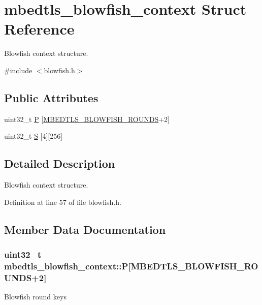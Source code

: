 \hypertarget{structmbedtls__blowfish__context}{\section{mbedtls\-\_\-blowfish\-\_\-context Struct Reference}
\label{structmbedtls__blowfish__context}
}


Blowfish context structure.  




{\ttfamily \#include $<$blowfish.\-h$>$}

\subsection*{Public Attributes}
\begin{DoxyCompactItemize}
\item 
uint32\-\_\-t \hyperlink{structmbedtls__blowfish__context_a6797f919a5b195cef17647d3d63ec13f}{P} \mbox{[}\hyperlink{blowfish_8h_a9a9858208f44ea332105fcb68ef93f06}{M\-B\-E\-D\-T\-L\-S\-\_\-\-B\-L\-O\-W\-F\-I\-S\-H\-\_\-\-R\-O\-U\-N\-D\-S}+2\mbox{]}
\item 
uint32\-\_\-t \hyperlink{structmbedtls__blowfish__context_ab366ec526d9d5303483ed9c5bbb6a049}{S} \mbox{[}4\mbox{]}\mbox{[}256\mbox{]}
\end{DoxyCompactItemize}


\subsection{Detailed Description}
Blowfish context structure. 

Definition at line 57 of file blowfish.\-h.



\subsection{Member Data Documentation}
\hypertarget{structmbedtls__blowfish__context_a6797f919a5b195cef17647d3d63ec13f}{
\subsubsection[{P}]{\setlength{\rightskip}{0pt plus 5cm}uint32\-\_\-t mbedtls\-\_\-blowfish\-\_\-context\-::\-P\mbox{[}{\bf M\-B\-E\-D\-T\-L\-S\-\_\-\-B\-L\-O\-W\-F\-I\-S\-H\-\_\-\-R\-O\-U\-N\-D\-S}+2\mbox{]}}}\label{structmbedtls__blowfish__context_a6797f919a5b195cef17647d3d63ec13f}
Blowfish round keys 

